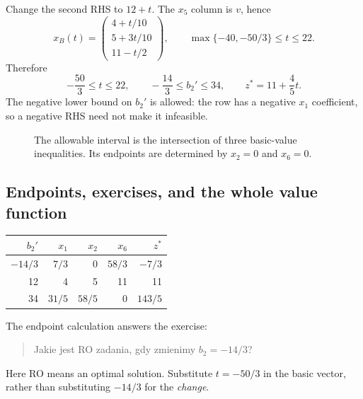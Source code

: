 \documentclass[11pt,a4paper]{article}
\begin{document}
Change the second RHS to $12+t$. The $x_5$ column is $v$, hence
\[
  x_B(t)=\begin{pmatrix}4+t/10\\5+3t/10\\11-t/2\end{pmatrix},
  \qquad \max\{-40,-50/3\}\leq t\leq22.
\]
Therefore
\begin{equation}\label{eq:rhs-result}
  -\frac{50}{3}\leq t\leq22,\qquad
  -\frac{14}{3}\leq b_2'\leq34,\qquad z^*=11+\frac45t.
\end{equation}
The negative lower bound on $b_2'$ is allowed: the row has a negative $x_1$
coefficient, so a negative RHS need not make it infeasible.

\begin{figure}[H]\centering
  \caption{The allowable interval is the intersection of three basic-value
    inequalities. Its endpoints are determined by $x_2=0$ and $x_6=0$.}
\end{figure}

\subsection{Endpoints, exercises, and the whole value function}
\begin{center}
  \begin{tabular}{r|rrr|r}\toprule
    $b_2'$ & $x_1$ & $x_2$ & $x_6$ & $z^*$\\\midrule
    $-14/3$ & $7/3$ & 0 & $58/3$ & $-7/3$\\
    12 & 4 & 5 & 11 & 11\\
    34 & $31/5$ & $58/5$ & 0 & $143/5$\\\bottomrule
  \end{tabular}
\end{center}
The endpoint calculation answers the exercise:
\begin{quote}
  Jakie jest RO zadania, gdy zmienimy $b_2=-14/3$?
\end{quote}
Here RO means an optimal solution. Substitute $t=-50/3$ in the basic vector,
rather than substituting $-14/3$ for the \emph{change}.
\end{document}
